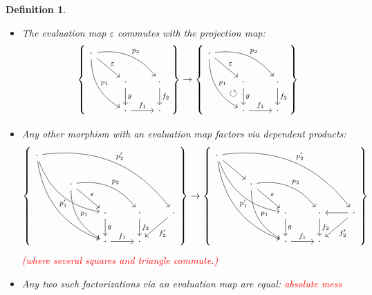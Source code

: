 \documentclass{article}
\newcommand{\todo}[1]{\textcolor{red}{#1}}
\newtheorem{definition}{Definition}
\begin{document}
\begin{definition}
\begin{itemize}
      (where the codomain is marked via $\mathrm{Pb}$ and $\mathrm{Pi}$ as indicated).
    \item
      The evaluation map $\varepsilon$ commutes with the projection map:
      \begin{equation}
        \left\{
          \begin{tikzcd}
            \cdot \arrow[ddr, bend right, "p_1"] \arrow[drr, bend left, "p_2"] \arrow[dr, "\varepsilon"] \\
            & \cdot \arrow[d, "g"] & \cdot \arrow[d, "f_2"] \\
            & \cdot \arrow[r, "f_1"] & \cdot
          \end{tikzcd}
        \right\}
        \rightarrow
        \left\{
          \begin{tikzcd}
            \cdot \arrow[ddr, bend right, "p_1"] \arrow[ddr, phantom, "\circlearrowleft", near end] \arrow[drr, bend left, "p_2"] \arrow[dr, "\varepsilon"] \\
            & \cdot \arrow[d, "g"] & \cdot \arrow[d, "f_2"] \\
            & \cdot \arrow[r, "f_1"] & \cdot
          \end{tikzcd}
        \right\}
      \end{equation}
    \item
      Any other morphism with an evaluation map factors via dependent products:
      \begin{equation}
        \left\{
          \begin{tikzcd}
            \cdot \arrow[dddrr, bend right, "p'_1"] \arrow[ddrrrr, bend left, "p'_2"] \arrow[ddrr, bend right] & \\
            & \cdot \arrow[ddr, bend right, "p_1"] \arrow[drr, bend left, "p_2"] \arrow[dr, "\varepsilon"] \\
            & & \cdot \arrow[d, "g"] & \cdot \arrow[d, "f_2"] & \cdot \arrow[dl, "f'_2"] \\
            & & \cdot \arrow[r, "f_1"] & \cdot
          \end{tikzcd}
        \right\}
        \rightarrow
        \left\{
          \begin{tikzcd}
            \cdot \arrow[dr] \arrow[dddrr, bend right, "p'_1"] \arrow[ddrrrr, bend left, "p'_2"] \arrow[ddrr, bend right] & \\
            & \cdot \arrow[ddr, bend right, "p_1"] \arrow[drr, bend left, "p_2"] \arrow[dr, "\varepsilon"] \\
            & & \cdot \arrow[d, "g"] & \cdot \arrow[d, "f_2"] & \cdot \arrow[dl, "f'_2"] \arrow[l] \\
            & & \cdot \arrow[r, "f_1"] & \cdot
          \end{tikzcd}
        \right\}
      \end{equation}
      \todo{(where several squares and triangle commute.)}
    \item
      Any two such factorizations via an evaluation map are equal:
      \todo{absolute mess}
  \end{itemize}
\end{definition}
\end{document}
